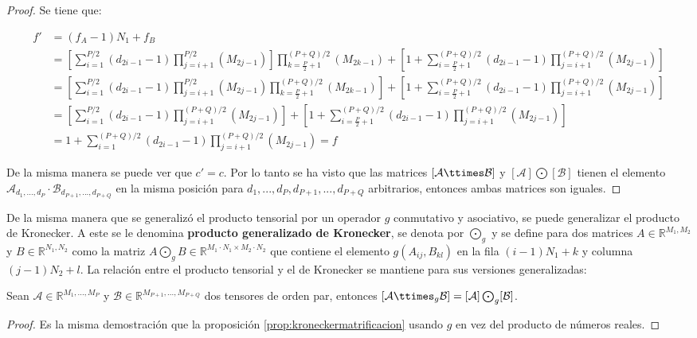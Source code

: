 \begin{proof}
Se tiene que:

\begin{align*}
f' 
&= (f_A -1)N_1 +f_B\\
&= \left[\sum_{i=1}^{P/2}(d_{2i-1}-1)\prod_{j=i+1}^{P/2}(M_{2j-1})\right] \prod_{k = \frac{P}{2} + 1}^{(P+Q)/2}(M_{2k-1})  + \left[ 1+\sum_{i=\frac{P}{2}+1}^{(P+Q)/2}(d_{2i-1}-1)\prod_{j=i+1}^{(P+Q)/2}(M_{2j-1})\right]\\ 
&= \left[\sum_{i=1}^{P/2}(d_{2i-1}-1)\prod_{j=i+1}^{P/2}(M_{2j-1}) \prod_{k = \frac{P}{2} + 1}^{(P+Q)/2}(M_{2k-1}) \right]  + \left[ 1+\sum_{i=\frac{P}{2}+1}^{(P+Q)/2}(d_{2i-1}-1)\prod_{j=i+1}^{(P+Q)/2}(M_{2j-1})\right]\\ 
&= \left[\sum_{i=1}^{P/2}(d_{2i-1}-1)\prod_{j=i+1}^{(P+Q)/2}(M_{2j-1})\right]  + \left[ 1+\sum_{i=\frac{P}{2}+1}^{(P+Q)/2}(d_{2i-1}-1)\prod_{j=i+1}^{(P+Q)/2}(M_{2j-1})\right]\\ 
&= 1 + \sum_{i=1}^{(P+Q)/2}(d_{2i-1}-1)\prod_{j=i+1}^{(P+Q)/2}(M_{2j-1}) = f
\end{align*}

De la misma manera se puede ver que $c' = c$. Por lo tanto se ha visto que las matrices $[\mathcal{A}\ttimes \mathcal{B}]$ y $[\mathcal{A}] \bigodot [\mathcal{B}]$ tienen el elemento $\mathcal{A}_{d_1,... ,d_P}  \cdot \mathcal{B}_{d_{P+1},... ,d_{P+Q}}$ en la misma posición para $d_1,... ,d_P,d_{P+1},... ,d_{P+Q}$ arbitrarios, entonces ambas matrices son iguales.
\end{proof}

De la misma manera que se generalizó el producto tensorial por un operador $g$ conmutativo y asociativo, se puede generalizar el producto de Kronecker. A este se le denomina \textbf{producto generalizado de Kronecker}, se denota por $\bigodot_g$ y se define para dos matrices $A\in\mathbb{R}^{M_1,M_2}$ y $B\in\mathbb{R}^{N_1,N_2}$ como la matriz $A\bigodot_g B\in \mathbb{R}^{M_1\cdot N_1 \times M_2 \cdot N_2}$ que contiene el elemento $g(A_{ij},B_{kl})$ en la fila $(i-1)N_1+k$ y columna $(j-1)N_2+l$. La relación entre el producto tensorial y el de Kronecker se mantiene para sus versiones generalizadas:

\begin{prop} \label{prop:kroneckermatrificaciongeneral}
Sean $\mathcal{A} \in \mathbb{R}^{M_1,... ,M_P}$ y $\mathcal{B} \in \mathbb{R}^{M_{P+1},... ,M_{P+Q}}$ dos tensores de orden par, entonces $[\mathcal{A}\ttimes_g \mathcal{B}] = [\mathcal{A}] \bigodot_g [\mathcal{B}]$. 
\end{prop}
\begin{proof}
Es la misma demostración que la proposición \ref{prop:kroneckermatrificacion} usando $g$ en vez del producto de números reales.
\end{proof}

